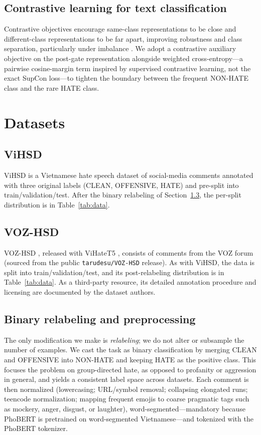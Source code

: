 \documentclass[11pt]{article}
\begin{document}
\subsection{Contrastive learning for text classification}
Contrastive objectives encourage same-class representations to be close and different-class representations to be far apart, improving robustness and class separation, particularly under imbalance \citep{supcon}. We adopt a contrastive auxiliary objective on the post-gate representation alongside weighted cross-entropy---a pairwise cosine-margin term inspired by supervised contrastive learning, not the exact SupCon loss---to tighten the boundary between the frequent NON-HATE class and the rare HATE class.

\section{Datasets}

\subsection{ViHSD}
ViHSD \citep{vihsd} is a Vietnamese hate speech dataset of social-media comments annotated with three original labels (CLEAN, OFFENSIVE, HATE) and pre-split into train/validation/test. After the binary relabeling of Section~\ref{sec:reshape}, the per-split distribution is in Table~\ref{tab:data}.

\subsection{VOZ-HSD}
VOZ-HSD \citep{vozhsd}, released with ViHateT5 \citep{vihatet5}, consists of comments from the VOZ forum (sourced from the public \texttt{tarudesu/VOZ-HSD} release). As with ViHSD, the data is split into train/validation/test, and its post-relabeling distribution is in Table~\ref{tab:data}. As a third-party resource, its detailed annotation procedure and licensing are documented by the dataset authors.

\subsection{Binary relabeling and preprocessing}
\label{sec:reshape}
The only modification we make is \emph{relabeling}; we do not alter or subsample the number of examples. We cast the task as binary classification by merging CLEAN and OFFENSIVE into NON-HATE and keeping HATE as the positive class. This focuses the problem on group-directed hate, as opposed to profanity or aggression in general, and yields a consistent label space across datasets. Each comment is then normalized (lowercasing; URL/symbol removal; collapsing elongated runs; teencode normalization; mapping frequent emojis to coarse pragmatic tags such as mockery, anger, disgust, or laughter), word-segmented---mandatory because PhoBERT is pretrained on word-segmented Vietnamese---and tokenized with the PhoBERT tokenizer.
\end{document}
